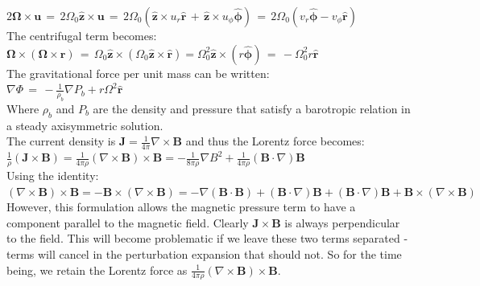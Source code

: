 \documentclass[letterpaper,12pt]{article}
\begin{document}
$2\mathbf{\Omega} \times \mathbf{u} \, = \, 2\Omega_0 \mathbf{\hat{z}} \times \mathbf{u} \, = \, 2\Omega_0\left(\mathbf{\hat{z}} \times u_r \mathbf{\hat{r}} \, + \, \mathbf{\hat{z}} \times u_{\phi} \mathbf{\hat{\phi}}\right) \, = \, 2\Omega_0\left(v_r \mathbf{\hat{\phi}} - v_{\phi}\mathbf{\hat{r}}\right) $\\

The centrifugal term becomes: \\

$\mathbf{\Omega} \times \left(\mathbf{\Omega} \times \mathbf{r} \right) \, = \, \Omega_0 \mathbf{\hat{z}} \times \left(\Omega_0 \mathbf{\hat{z}} \times \mathbf{\hat{r}}\right) = \Omega_0^2 \mathbf{\hat{z}} \times \left(r \mathbf{\hat{\phi}}\right) \, = \, -\Omega_0^2 r \mathbf{\hat{r}}$ \\

The gravitational force per unit mass can be written: \\

$\nabla\Phi \, = \, -\frac{1}{\rho_b}\nabla P_b + r\Omega^2 \mathbf{\hat{r}}$ \\

Where $\rho_b$ and $P_b$ are the density and pressure that satisfy a barotropic relation in a steady axisymmetric solution. \\

The current density is $\mathbf{J} = \frac{1}{4\pi} \nabla \times \mathbf{B}$ and thus the Lorentz force becomes: \\

$\frac{1}{\rho} \left(\mathbf{J}\times\mathbf{B}\right) = \frac{1}{4 \pi \rho} \left( \nabla \times \mathbf{B} \right) \times \mathbf{B} = - \frac{1}{8 \pi \rho}\nabla B^2 + \frac{1}{4 \pi \rho} \left(\mathbf{B} \cdot \nabla\right)\mathbf{B}$ \\

Using the identity: \\

$\left( \nabla \times \mathbf{B} \right) \times \mathbf{B} = - \mathbf{B} \times \left( \nabla \times \mathbf{B} \right) = -\nabla \left(\mathbf{B} \cdot \mathbf{B}\right) + \left(\mathbf{B} \cdot \nabla \right)\mathbf{B} + \left(\mathbf{B} \cdot \nabla \right)\mathbf{B} + \mathbf{B} \times \left(\nabla \times \mathbf{B}\right)$ \\

However, this formulation allows the magnetic pressure term to have a component parallel to the magnetic field. Clearly $\mathbf{J} \times \mathbf{B}$ is always perpendicular to the field. This will become problematic if we leave these two terms separated \-- terms will cancel in the perturbation expansion that should not. So for the time being, we retain the Lorentz force as $\frac{1}{4 \pi \rho} \left( \nabla \times \mathbf{B} \right) \times \mathbf{B}$. \\
\end{document}
